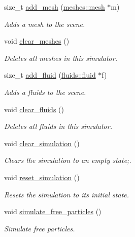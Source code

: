 \begin{DoxyCompactItemize}
size\+\_\+t \hyperlink{classphysim_1_1simulator_a65e96ed22a3d12c5be1ff933d4c79436}{add\+\_\+mesh} (\hyperlink{classphysim_1_1meshes_1_1mesh}{meshes\+::mesh} $\ast$m)
\begin{DoxyCompactList}\small\item\em Adds a mesh to the scene. \end{DoxyCompactList}\item 
void \hyperlink{classphysim_1_1simulator_a050e1ddeece122406b045262e40d4063}{clear\+\_\+meshes} ()
\begin{DoxyCompactList}\small\item\em Deletes all meshes in this simulator. \end{DoxyCompactList}\item 
size\+\_\+t \hyperlink{classphysim_1_1simulator_a0b65d437e6e32a851251cfab5d184382}{add\+\_\+fluid} (\hyperlink{classphysim_1_1fluids_1_1fluid}{fluids\+::fluid} $\ast$f)
\begin{DoxyCompactList}\small\item\em Adds a fluids to the scene. \end{DoxyCompactList}\item 
void \hyperlink{classphysim_1_1simulator_adda92bb271d38830fa374d61a160afeb}{clear\+\_\+fluids} ()
\begin{DoxyCompactList}\small\item\em Deletes all fluids in this simulator. \end{DoxyCompactList}\item 
void \hyperlink{classphysim_1_1simulator_a5881327d525fd4928fd274528863d9f7}{clear\+\_\+simulation} ()
\begin{DoxyCompactList}\small\item\em Clears the simulation to an empty state;. \end{DoxyCompactList}\item 
void \hyperlink{classphysim_1_1simulator_a6d3a5491771496c3da2be7c3382f061b}{reset\+\_\+simulation} ()
\begin{DoxyCompactList}\small\item\em Resets the simulation to its initial state. \end{DoxyCompactList}\item 
void \hyperlink{classphysim_1_1simulator_ac836fc5c8ccf186b8030da54586a8b07}{simulate\+\_\+free\+\_\+particles} ()
\begin{DoxyCompactList}\small\item\em Simulate free particles. \end{DoxyCompactList}\item 

\end{DoxyCompactItemize}
